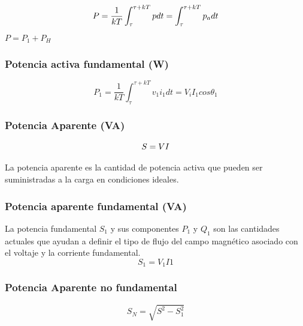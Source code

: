 \begin{equation}\label{EQ25}
P=\frac{1}{kT}\int_{\tau}^{\tau + kT}pdt=\int_{\tau}^{\tau + kT}p_{a}dt\\
\end{equation}
$P=P_{1}+P_{H}$\\

\subsubsection{Potencia activa fundamental (W)}


\begin{equation}\label{EQ26}
P_{1}=\frac{1}{kT}\int_{\tau}^{\tau + kT}v_{1}i_{1}dt=V_{i}I_{1}cos \theta_{1}
\end{equation}

\subsubsection{Potencia Aparente (VA)}

\begin{equation}\label{EQ27}
S=VI\\
\end{equation}

La potencia aparente es la cantidad de potencia activa que pueden ser suministradas a la carga en condiciones ideales.\cite{A30}\\

\subsubsection{Potencia aparente fundamental (VA)}

La potencia fundamental $S_{1}$ y sus componentes $P_{1}$ y $Q_{1}$ son las cantidades actuales que ayudan a definir el tipo de flujo del campo magnético asociado con el voltaje y la corriente fundamental.\cite{A30}\\

\begin{equation}\label{EQ28}
S_{1}=V_{1}I{1}
\end{equation}

\subsubsection{Potencia Aparente no fundamental}

\begin{equation}\label{EQ29}
S_{N}=\sqrt{S^2-S^2_{1}}
\end{equation}

